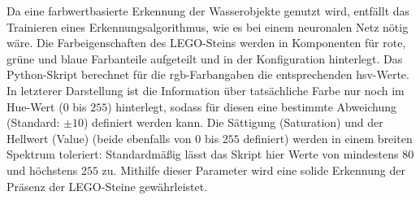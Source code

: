 Da eine farbwertbasierte Erkennung der Wasserobjekte genutzt wird, entfällt das Trainieren eines Erkennungsalgorithmus, wie es bei einem neuronalen Netz nötig wäre.
Die Farbeigenschaften des LEGO-Steins werden in Komponenten für rote, grüne und blaue Farbanteile aufgeteilt und in der Konfiguration hinterlegt.
Das Python-Skript berechnet für die \acs{rgb}-Farbangaben die entsprechenden \acs{hsv}-Werte.
In letzterer Darstellung ist die Information über tatsächliche Farbe nur noch im Hue-Wert ($0$ bis $255$) hinterlegt, sodass für diesen eine bestimmte Abweichung (Standard: $\pm 10$) definiert werden kann.
Die Sättigung (Saturation) und der Hellwert (Value) (beide ebenfalls von $0$ bis $255$ definiert) werden in einem breiten Spektrum toleriert:
Standardmäßig lässt das Skript hier Werte von mindestens $80$ und höchstens $255$ zu.
Mithilfe dieser Parameter wird eine solide Erkennung der Präsenz der LEGO-Steine gewährleistet.